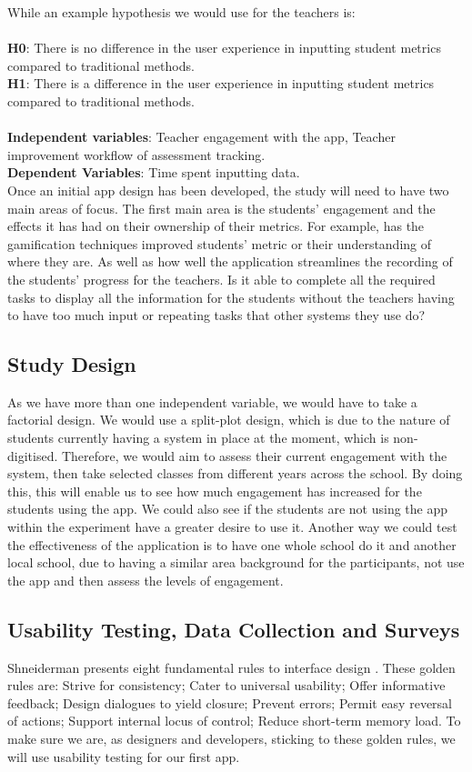 \documentclass[sigchi]{acmart}
\begin{document}
While an  example hypothesis we would use for the teachers is:\\\\
\textbf{H0}: There is no difference in the user experience in inputting student metrics compared to traditional methods.\\
\textbf{H1}: There is a difference in the user experience in inputting student metrics compared to traditional methods.\\\\
\textbf{Independent variables}: Teacher engagement with the app, Teacher improvement workflow of assessment tracking.\\
\textbf{Dependent Variables}: Time spent inputting data.\\

Once an initial app design has been developed, the study will need to have two main areas of focus. The first main area is the students' engagement and the effects it has had on their ownership of their metrics. For example, has the gamification techniques improved students' metric or their understanding of where they are. As well as how well the application streamlines the recording of the students' progress for the teachers. Is it able to complete all the required tasks to display all the information for the students without the teachers having to have too much input or repeating tasks that other systems they use do?

\subsection{Study Design}
As we have more than one independent variable, we would have to take a factorial design. We would use a split-plot design, which is due to the nature of students currently having a system in place at the moment, which is non-digitised. Therefore, we would aim to assess their current engagement with the system, then take selected classes from different years across the school. By doing this, this will enable us to see how much engagement has increased for the students using the app. We could also see if the students are not using the app within the experiment have a greater desire to use it. Another way we could test the effectiveness of the application is to have one whole school do it and another local school, due to having a similar area background for the participants, not use the app and then assess the levels of engagement.


\subsection{Usability Testing, Data Collection and Surveys}
Shneiderman presents eight fundamental rules to interface design \cite{shneiderman2016designing}. These golden rules are: Strive for consistency; Cater to universal usability; Offer informative feedback; Design dialogues to yield closure; Prevent errors; Permit easy reversal of actions; Support internal locus of control; Reduce short-term memory load. To make sure we are, as designers and developers, sticking to these golden rules, we will use usability testing for our first app.
\end{document}
